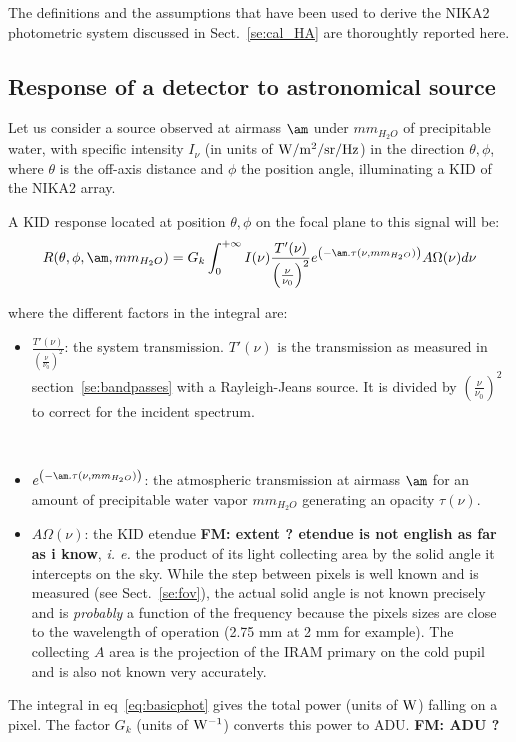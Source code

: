

The definitions and the assumptions that have been used to derive the
NIKA2 photometric system discussed in Sect.~\ref{se:cal_HA} are
thoroughtly reported here.


\subsection{Response of a detector to astronomical source}


Let us consider a source observed at airmass $\am$ under
$mm_{H_{2}O}$ of precipitable water, with specific intensity $I_{\nu}$ (in units
of  ${\rm W/m^{2}/sr/Hz}$) in the direction $\theta, \phi$, where $\theta$
is the off-axis distance and $\phi$ the position angle, illuminating a KID
of the NIKA2 array. 

A KID response located at position $\theta, \phi$
on the focal plane to this signal will be:
\begin{equation}
R(\theta, \phi, \am, mm_{H_{2}O}) = G_{k} \int_{0}^{+\infty} I(\nu)
\frac{T'(\nu)}{\left(\frac{\nu}{\nu_{0}}\right)^{2}} e^{\left(-\am
  . \tau(\nu,  mm_{H_{2}O})\right)}A\Omega (\nu)  d\nu 
\label{eq:basicphot}
\end{equation}


where the different factors in the integral are:
\begin{itemize}
\item $\frac{T'(\nu)}{\left(\frac{\nu}{\nu_{0}}\right)^{2}}$:  the
  system transmission. $T'(\nu)$ is the transmission as measured in
  section~\ref{se:bandpasses} with a Rayleigh-Jeans source. It is
  divided by $\left(\frac{\nu}{\nu_{0}}\right)^{2}$ to correct for the
  incident spectrum.
   
   \\

\item $e^{\left(-\am . \tau(\nu,  mm_{H_{2}O} )\right)}$: the
  atmospheric transmission at airmass  $\am$ for an amount of
  precipitable water vapor $mm_{H_{2}O}$ generating an opacity $\tau(\nu)$.
\item $A\Omega (\nu) $: the KID etendue   {\bf FM: extent ? etendue is not english as far as i know}, {\it i. e.} the product of
  its light collecting area by the solid angle it intercepts on the
  sky. While the step between  pixels is well known and is measured (see Sect.~\ref{se:fov}), the
  actual solid angle is not known precisely and is {\em probably} a function of the
  frequency  because the pixels sizes are close to the wavelength of
  operation (2.75 mm at 2 mm for example). The collecting $A$ area is the
  projection of the IRAM primary on the cold pupil and is also not
  known very accurately.
\end{itemize}
The integral in eq~\ref{eq:basicphot} gives the total power (units of $\rm W$)
falling on a pixel. The factor $G_{k}$ (units of  $\rm W^{-1}$) converts this
power to ADU. {\bf FM:  ADU ?}

